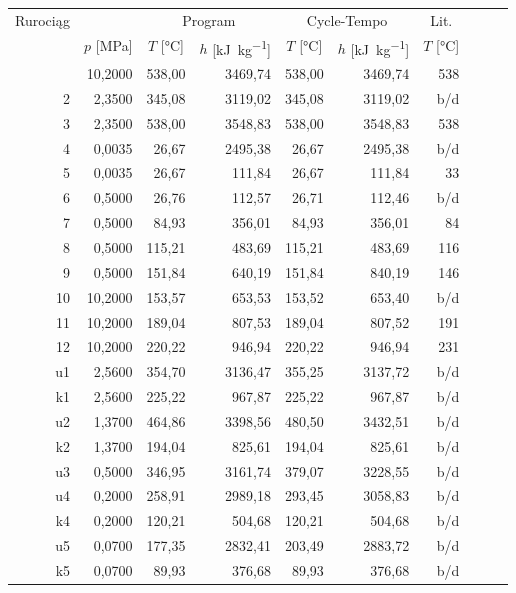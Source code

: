 \begin{longtable}{|*{10}{r|}}
	\hline
		\multirow{2}{*}{Rurociąg} &
		&
		\multicolumn{2}{c|}{Program} &
		\multicolumn{2}{c|}{Cycle-Tempo} &
		\multicolumn{1}{c|}{Lit.} \\
	\cline{3-7}
		&
		\multicolumn{1}{c|}{$p$ [\si{\mega\pascal}]} &
		\multicolumn{1}{c|}{$T$ [\si{\degreeCelsius}]} &
		\multicolumn{1}{c|}{$h$ [\si{\kilo\joule\per\kilogram}]} &
		\multicolumn{1}{c|}{$T$ [\si{\degreeCelsius}]} &
		\multicolumn{1}{c|}{$h$ [\si{\kilo\joule\per\kilogram}]} &
		\multicolumn{1}{c|}{$T$ [\si{\degreeCelsius}]} \\
	\hline
	\endhead
	\hline
	\endfoot
		 1 & 10,2000 & 538,00 & 3469,74 & 538,00 & 3469,74 & 538 \\
		 2 &  2,3500 & 345,08 & 3119,02 & 345,08 & 3119,02 & b/d \\
		 3 &  2,3500 & 538,00 & 3548,83 & 538,00 & 3548,83 & 538 \\
		 4 &  0,0035 &  26,67 & 2495,38 &  26,67 & 2495,38 & b/d \\
		 5 &  0,0035 &  26,67 &  111,84 &  26,67 &  111,84 &  33 \\
		 6 &  0,5000 &  26,76 &  112,57 &  26,71 &  112,46 & b/d \\
		 7 &  0,5000 &  84,93 &  356,01 &  84,93 &  356,01 &  84 \\
		 8 &  0,5000 & 115,21 &  483,69 & 115,21 &  483,69 & 116 \\
		 9 &  0,5000 & 151,84 &  640,19 & 151,84 &  840,19 & 146 \\
		10 & 10,2000 & 153,57 &  653,53 & 153,52 &  653,40 & b/d \\
		11 & 10,2000 & 189,04 &  807,53 & 189,04 &  807,52 & 191 \\
		12 & 10,2000 & 220,22 &  946,94 & 220,22 &  946,94 & 231 \\
		u1 &  2,5600 & 354,70 & 3136,47 & 355,25 & 3137,72 & b/d \\
		k1 &  2,5600 & 225,22 &  967,87 & 225,22 &  967,87 & b/d \\
		u2 &  1,3700 & 464,86 & 3398,56 & 480,50 & 3432,51 & b/d \\
		k2 &  1,3700 & 194,04 &  825,61 & 194,04 &  825,61 & b/d \\
		u3 &  0,5000 & 346,95 & 3161,74 & 379,07 & 3228,55 & b/d \\
		u4 &  0,2000 & 258,91 & 2989,18 & 293,45 & 3058,83 & b/d \\
		k4 &  0,2000 & 120,21 &  504,68 & 120,21 &  504,68 & b/d \\
		u5 &  0,0700 & 177,35 & 2832,41 & 203,49 & 2883,72 & b/d \\
		k5 &  0,0700 &  89,93 &  376,68 &  89,93 &  376,68 & b/d \\
\end{longtable}
